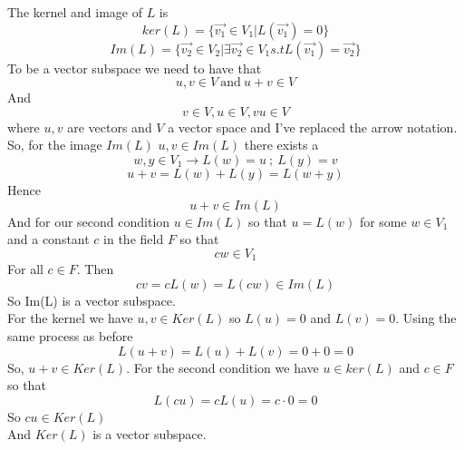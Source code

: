 \documentclass[12pt]{article}
\begin{document}
\begin{enumerate}
The kernel and image of $L$ is 
$$ ker(L) = \{ \vec{v_1} \in V_1 | L(\vec{v_1}) = 0 \} $$
$$ Im(L) = \{ \vec{v_2}\in V_2 | \exists \vec{v_2} \in V_1 s.t L(\vec{v_1})= \vec{v_2}\}$$
To be a vector subspace we need to have that 
$$ u,v \in V \ \text{and} \ u+v \in V$$ 
And
$$ v \in V, u \in V, vu \in V $$
where $u,v$ are vectors and $V$ a vector space and I've replaced the arrow notation. \\
So, for the image $Im(L)$  $u,v \in Im(L)$ there exists a 
$$ w,y \in V_1 \rightarrow L(w) = u \ ; \ L(y) = v$$
$$ u + v = L(w) + L(y) = L(w+y)$$
Hence 
$$ u + v \in Im(L) $$
And for our second condition $u \in Im(L)$ so that $u = L(w)$ for some $w \in V_1$ and a constant $c$ in the field $F$ so that 
$$ cw \in V_1 $$
For all $c \in F$. Then 
$$ cv = c L(w) = L(cw) \in Im(L) $$ 
So Im(L) is a vector subspace. \\
For the kernel we have $u,v \in Ker(L)$ so $L(u) =0$ and $L(v) =0$. Using the same process as before 
$$ L(u + v) = L(u) + L(v) = 0 + 0 = 0 $$ 
So, $u + v \in Ker(L) $. For the second condition we have $u \in ker(L)$ and $c \in F$ so that 
$$ L(c u) = cL(u) = c \cdot 0 =0 $$
So $c u \in Ker(L) $ \\
And $Ker(L)$ is a vector subspace. 

\end{enumerate}
\end{document}
